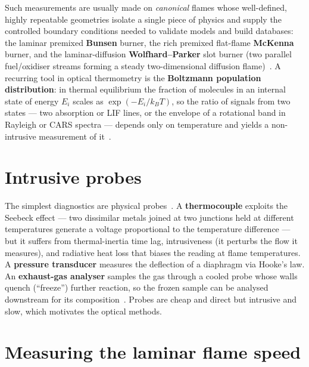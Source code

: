 Such measurements are usually made on \emph{canonical} flames whose well-defined, highly repeatable geometries isolate a single piece of physics and supply the controlled boundary conditions needed to validate models and build databases: the laminar premixed \textbf{Bunsen} burner, the rich premixed flat-flame \textbf{McKenna} burner, and the laminar-diffusion \textbf{Wolfhard--Parker} slot burner (two parallel fuel/oxidiser streams forming a steady two-dimensional diffusion flame)~\cite{lecture6,lecture5,warnatz2006combustion}. A recurring tool in optical thermometry is the \textbf{Boltzmann population distribution}: in thermal equilibrium the fraction of molecules in an internal state of energy $E_i$ scales as $\exp(-E_i/k_BT)$, so the ratio of signals from two states --- two absorption or LIF lines, or the envelope of a rotational band in Rayleigh or CARS spectra --- depends only on temperature and yields a non-intrusive measurement of it~\cite{lecture6,lecture7}.
\section{Intrusive probes}

The simplest diagnostics are physical probes~\cite{lecture6}. A \textbf{thermocouple} exploits the Seebeck effect --- two dissimilar metals joined at two junctions held at different temperatures generate a voltage proportional to the temperature difference --- but it suffers from thermal-inertia time lag, intrusiveness (it perturbs the flow it measures), and radiative heat loss that biases the reading at flame temperatures. A \textbf{pressure transducer} measures the deflection of a diaphragm via Hooke's law. An \textbf{exhaust-gas analyser} samples the gas through a cooled probe whose walls quench (``freeze'') further reaction, so the frozen sample can be analysed downstream for its composition~\cite{lecture6}. Probes are cheap and direct but intrusive and slow, which motivates the optical methods.

\section{Measuring the laminar flame speed}

